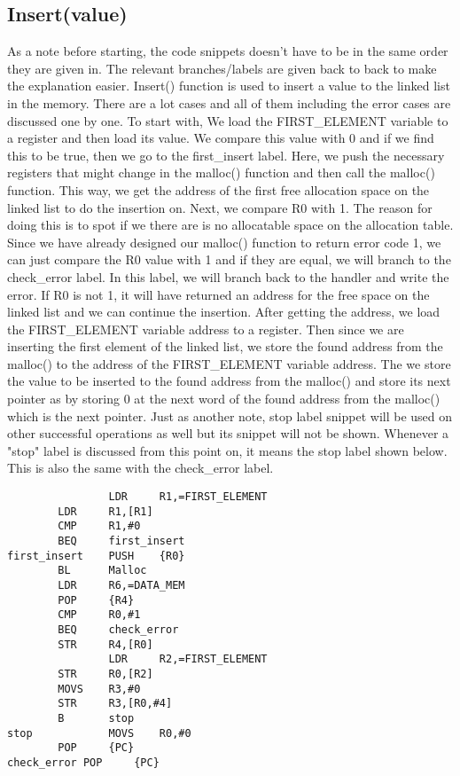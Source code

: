 \documentclass[pdftex,12pt,a4paper]{article}
\begin{document}
\subsection{Insert(value)}
As a note before starting, the code snippets doesn't have to be in the same order they are given in. The relevant branches/labels are given back to back to make the explanation easier.
Insert() function is used to insert a value to the linked list in the memory. There are a lot cases and all of them including the error cases are discussed one by one. To start with, We load the FIRST\_ELEMENT variable to a register and then load its value. We compare this value with 0 and if we find this to be true, then we go to the first\_insert label. Here, we push the necessary registers that might change in the malloc() function and then call the malloc() function. This way, we get the address of the first free allocation space on the linked list to do the insertion on. Next, we compare R0 with 1. The reason for doing this is to spot if we there are is no allocatable space on the allocation table. Since we have already designed our malloc() function to return error code 1, we can just compare the R0 value with 1 and if they are equal, we will branch to the check\_error label. In this label, we will branch back to the handler and write the error. If R0 is not 1, it will have returned an address for the free space on the linked list and we can continue the insertion. After getting the address, we load the FIRST\_ELEMENT variable address to a register. Then since we are inserting the first element of the linked list, we store the found address from the malloc() to the address of the FIRST\_ELEMENT variable address. The we store the value to be inserted to the found address from the malloc() and store its next pointer as by storing 0 at the next word of the found address from the malloc() which is the next pointer. Just as another note, stop label snippet will be used on other successful operations as well but its snippet will not be shown. Whenever a "stop" label is discussed from this point on, it means the stop label shown below. This is also the same with the check\_error label.

\begin{lstlisting}
                LDR     R1,=FIRST_ELEMENT		
		LDR     R1,[R1]					
		CMP     R1,#0					
		BEQ     first_insert
first_insert	PUSH    {R0}					
		BL      Malloc					
		LDR     R6,=DATA_MEM				
		POP     {R4}					
		CMP     R0,#1					
		BEQ     check_error				
		STR     R4,[R0]					
    	        LDR     R2,=FIRST_ELEMENT		
		STR     R0,[R2]					
		MOVS    R3,#0						
		STR     R3,[R0,#4]					
		B       stop	
stop 	        MOVS    R0,#0						
		POP     {PC}
check_error	POP     {PC}						
\end{lstlisting}
\end{document}
